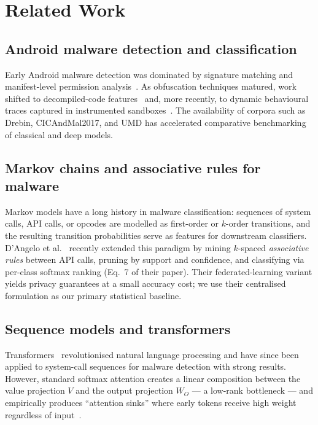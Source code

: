 \section{Related Work}
\label{sec:related}

\subsection{Android malware detection and classification}

Early Android malware detection was dominated by signature matching and
manifest-level permission analysis~\cite{felt2011survey}. As
obfuscation techniques matured, work shifted to
decompiled-code features~\cite{arp2014drebin} and, more recently, to
dynamic behavioural traces captured in instrumented
sandboxes~\cite{ali2020ransomware}. The availability of corpora such as
Drebin, CICAndMal2017, and UMD has accelerated comparative benchmarking
of classical and deep models.

\subsection{Markov chains and associative rules for malware}

Markov models have a long history in malware classification: sequences of
system calls, API calls, or opcodes are modelled as first-order or
$k$-order transitions, and the resulting transition probabilities serve
as features for downstream classifiers. D'Angelo et
al.~\cite{dangelo2023association} recently extended this paradigm by
mining $k$-spaced \emph{associative rules} between API calls, pruning
by support and confidence, and classifying via per-class softmax ranking
(Eq.~7 of their paper). Their federated-learning variant yields privacy
guarantees at a small accuracy cost; we use their centralised
formulation as our primary statistical baseline.

\subsection{Sequence models and transformers}

Transformers~\cite{vaswani2017attention} revolutionised natural language
processing and have since been applied to system-call sequences for
malware detection with strong results. However, standard softmax
attention creates a linear composition between the value projection
$V$ and the output projection $W_O$ — a low-rank bottleneck — and
empirically produces ``attention sinks'' where early tokens receive
high weight regardless of input~\cite{qiu2025gated}.

